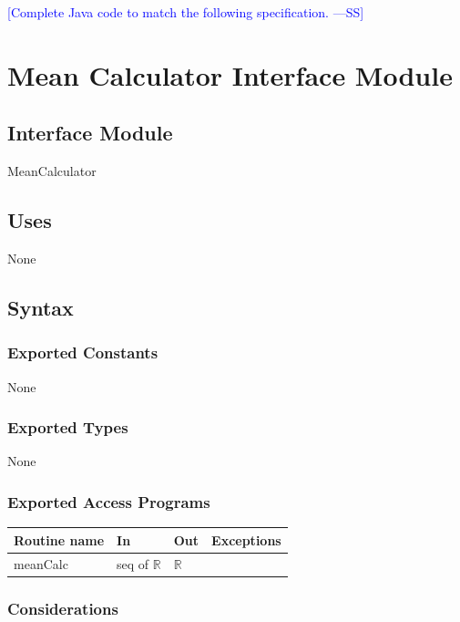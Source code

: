 \documentclass[12pt,fleqn]{examtst}
\newcommand{\authornote}[3]{\textcolor{#1}{[#3 ---#2]}}
\newcommand{\authornote}[3]{}
\newcommand{\wss}[1]{\authornote{blue}{SS}{#1}}
\begin{document}
\wss{Complete Java code to match the following specification.}


\newpage

\section* {Mean Calculator Interface Module}

\subsection*{Interface Module}

MeanCalculator

\subsection* {Uses}

None

\subsection* {Syntax}

\subsubsection* {Exported Constants}

None

\subsubsection* {Exported Types}

None 

\subsubsection* {Exported Access Programs}

\begin{tabular}{| l | l | l | p{5cm} |}
\hline
\textbf{Routine name} & \textbf{In} & \textbf{Out} & \textbf{Exceptions}\\
\hline
meanCalc & seq of $\mathbb{R}$ & $\mathbb{R}$ & ~\\
\hline
\end{tabular}

\subsubsection* {Considerations}
\end{document}

